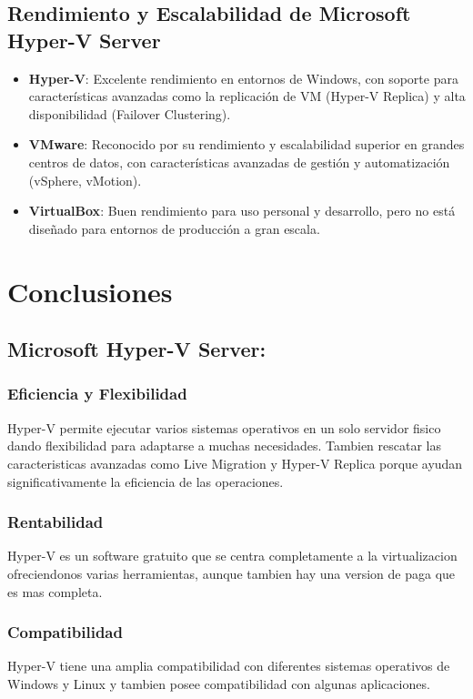 \documentclass[journal]{IEEEtran}
\begin{document}
\subsection{Rendimiento y Escalabilidad de Microsoft Hyper-V Server}
\begin{itemize}
    \item \textbf{Hyper-V}: Excelente rendimiento en entornos de Windows, con soporte para características avanzadas como la replicación de VM (Hyper-V Replica) y alta disponibilidad (Failover Clustering).
    \item \textbf{VMware}: Reconocido por su rendimiento y escalabilidad superior en grandes centros de datos, con características avanzadas de gestión y automatización (vSphere, vMotion).
    \item \textbf{VirtualBox}: Buen rendimiento para uso personal y desarrollo, pero no está diseñado para entornos de producción a gran escala.
\end{itemize}

\section{Conclusiones}
\subsection{Microsoft Hyper-V Server:}
\subsubsection{Eficiencia y Flexibilidad}
Hyper-V permite ejecutar varios sistemas operativos en un solo servidor fisico dando flexibilidad para adaptarse a muchas necesidades. Tambien rescatar las caracteristicas avanzadas como Live Migration y Hyper-V Replica porque ayudan significativamente la eficiencia de las operaciones.
\subsubsection{Rentabilidad}
Hyper-V es un software gratuito que se centra completamente a la virtualizacion ofreciendonos varias herramientas, aunque tambien hay una version de paga que es mas completa.
\subsubsection{Compatibilidad}
Hyper-V tiene una amplia compatibilidad con diferentes sistemas operativos de Windows y Linux y tambien posee compatibilidad con algunas aplicaciones.\\
\end{document}
